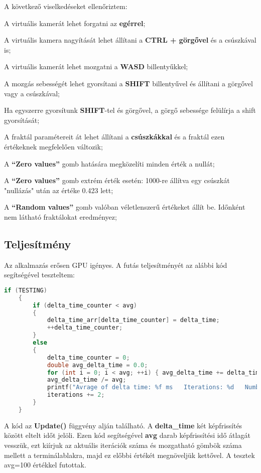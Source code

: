 A következő viselkedéseket ellenőriztem:
\begin{compactenum}
	\item A virtuális kamerát lehet forgatni az \textbf{egérrel};
	\item A virtuális kamera nagyítását lehet állítani a \textbf{CTRL + görgővel} és a csúszkával is;
	\item A virtuális kamerát lehet mozgatni a \textbf{WASD} billentyűkkel;
	\item A mozgás sebességét lehet gyorsítani a \textbf{SHIFT} billentyűvel és állítani a görgővel vagy a csúszkával;
	\item Ha egyszerre gyorsítunk \textbf{SHIFT}-tel és görgővel, a görgő sebessége felülírja a shift gyorsítását;
	\item A fraktál paramétereit át lehet állítani a \textbf{csúszkákkal} és a fraktál ezen értékeknek megfelelően változik;
	\item A \textbf{``Zero values''} gomb hatására megközelíti minden érték a nullát;
	\item A \textbf{``Zero values''} gomb extrém érték esetén: 1000-re állítva egy csúszkát "nullázás" után az értéke 0.423 lett;
	\item A \textbf{``Random values''} gomb valóban véletlenszerű értékeket állít be. Időnként nem látható fraktálokat eredményez;
\end{compactenum}

\subsection{Teljesítmény}

Az alkalmazás erősen GPU igényes.  A futás teljesítményét az alábbi kód segítségével teszteltem:
\begin{lstlisting}[language={C++}]
if (TESTING)
	{
		if (delta_time_counter < avg)
		{
			delta_time_arr[delta_time_counter] = delta_time;
			++delta_time_counter;
		}
		else
		{
			delta_time_counter = 0;
			double avg_delta_time = 0.0;
			for (int i = 0; i < avg; ++i) { avg_delta_time += delta_time_arr[i]; }
			avg_delta_time /= avg;
			printf("Avrage of delta time: %f ms   Iterations: %d   Number of spheres: %d \n", avg_delta_time*1000, iterations, ballCount);
			iterations += 2;
		}
	}
\end{lstlisting}

A kód az \textbf{Update()} függvény alján található. A \textbf{delta\_time} két képfrissítés között eltelt időt jelöli. Ezen kód segítségével \textbf{avg} darab képfrissítési idő átlagát vesszük, ezt kiírjuk az aktuális iterációk száma és mozgatható gömbök száma mellett a terminálablakra, majd ez előbbi értékét megnöveljük kettővel. A tesztek avg=100 értékkel futottak.


